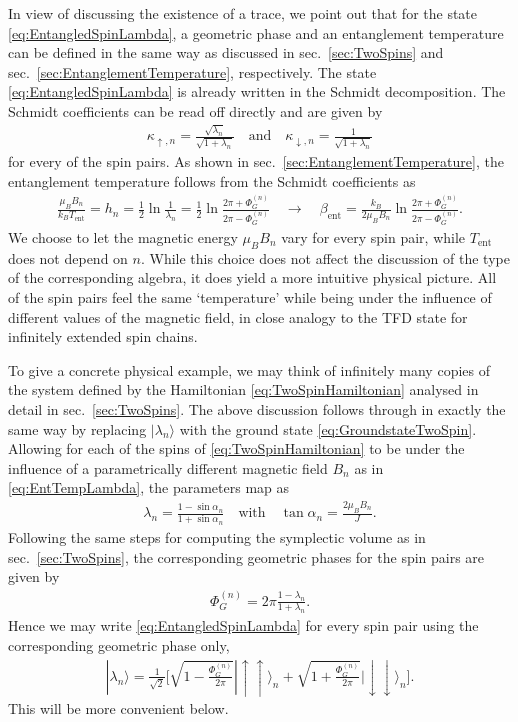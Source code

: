 \documentclass[a4paper,11pt]{article}
\newcommand{\1}{\mathds{1}}
\begin{document}
In view of discussing the existence of a trace, we point out that for the state \eqref{eq:EntangledSpinLambda}, a geometric phase and an entanglement temperature can be defined in the same way as discussed in sec.~\ref{sec:TwoSpins} and sec.~\ref{sec:EntanglementTemperature}, respectively. The state \eqref{eq:EntangledSpinLambda} is already written in the Schmidt decomposition. The Schmidt coefficients can be read off directly and are given by
\begin{align}
    \kappa_{\uparrow,n}=\frac{\sqrt{\lambda_n}}{\sqrt{1+\lambda_n}}\quad\text{and}\quad\kappa_{\downarrow,n}=\frac{1}{\sqrt{1+\lambda_n}}
\end{align}
for every of the spin pairs. As shown in sec.~\ref{sec:EntanglementTemperature}, the entanglement temperature follows from the Schmidt coefficients as
\begin{align}
    \frac{\mu_BB_n}{k_BT_{\text{ent}}}=h_n=\frac{1}{2}\ln\frac{1}{\lambda_n}=\frac{1}{2}\ln\frac{2\pi+\Phi_G^{(n)}}{2\pi-\Phi_G^{(n)}}\quad\to\quad\beta_{\text{ent}}=\frac{k_B}{2\mu_BB_n}\ln\frac{2\pi+\Phi_G^{(n)}}{2\pi-\Phi_G^{(n)}}.\label{eq:EntTempLambda}
\end{align}
We choose to let the magnetic energy $\mu_BB_n$ vary for every spin pair, while $T_{\text{ent}}$ does not depend on $n$. While this choice does not affect the discussion of the type of the corresponding algebra, it does yield a more intuitive physical picture. All of the spin pairs feel the same `temperature' while being under the influence of different values of the magnetic field, in close analogy to the TFD state for infinitely extended spin chains.

To give a concrete physical example, we may think of infinitely many copies of the system defined by the Hamiltonian \eqref{eq:TwoSpinHamiltonian} analysed in detail in sec.~\ref{sec:TwoSpins}. The above discussion follows through in exactly the same way by replacing $|\lambda_n\rangle$ with the ground state \eqref{eq:GroundstateTwoSpin}. Allowing for each of the spins of \eqref{eq:TwoSpinHamiltonian} to be under the influence of a parametrically different magnetic field $B_n$ as in \eqref{eq:EntTempLambda}, the parameters map as
\begin{align}
    \lambda_n=\frac{1-\sin\alpha_n}{1+\sin\alpha_n}\quad\text{with}\quad\tan\alpha_n=\frac{2\mu_BB_n}{J}.
\end{align}
Following the same steps for computing the symplectic volume as in sec.~\ref{sec:TwoSpins}, the corresponding geometric phases for the spin pairs are given by
\begin{align}
    \Phi_G^{(n)}=2\pi\frac{1-\lambda_n}{1+\lambda_n}.\label{eq:GeomPhaseLambda}
\end{align}
Hence we may write \eqref{eq:EntangledSpinLambda} for every spin pair using the corresponding geometric phase only, 
\begin{align}
    |\lambda_n\rangle=\frac{1}{\sqrt{2}}\Bigg[\sqrt{1-\frac{\Phi_G^{(n)}}{2\pi}}|\!\uparrow\uparrow\rangle_n+\sqrt{1+\frac{\Phi_G^{(n)}}{2\pi}}|\!\downarrow\downarrow\rangle_n\Bigg].\label{eq:EntangledSpinGeomPhase}
\end{align}
This will be more convenient below.
\end{document}
